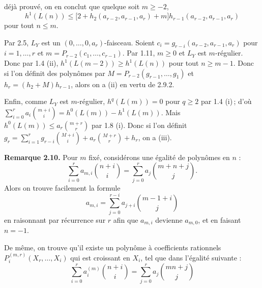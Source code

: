 
déjà
prouvé, on en conclut que quelque soit \(m\ge -2\),
\[
h^1(L(n))\le
\bigl[2+h_2(a_{r-2},a_{r-1},a_r)+m\bigr]
h_{r-1}(a_{r-2},a_{r-1},a_r)
\tag{2.9.2}
\]
pour tout \(n\le m\).

Par 2.5, \(L_Y\) est un \((0,\ldots,0,a_r)\)-faisceau. Soient \(c_i=g_{r-i}(a_{r-2},a_{r-1},a_r)\) pour \(i=1,\ldots,r\) et \(m=P_{r-2}(c_1,\ldots,c_{r-1})\). Par 1.11, \(m\ge0\) et \(L_Y\) est \(m\)-régulier. Donc par 1.4 (ii), \(h^1(L(m-2))\ge h^1(L(n))\) pour tout \(n\ge m-1\). Donc si l'on définit des polynômes par \(M=P_{r-2}(g_{r-1},\ldots,g_1)\) et \(h_r=(h_2+M)h_{r-1}\), alors on a (ii) en vertu de 2.9.2.

Enfin, comme \(L_Y\) est \(m\)-régulier, \(h^q(L(m))=0\) pour \(q\ge2\) par 1.4 (i)\,; d'où \(\sum_{i=0}^{r}a_i\binom{m+i}{i}=h^0(L(m))-h^1(L(m))\). Mais \(h^0(L(m))\le a_r\binom{m+r}{r}\) par 1.8 (i). Donc si l'on définit \(g_r=\sum_{i=1}^{r}g_{r-i}\binom{M+i}{i}+a_r\binom{M+r}{r}+h_r\), on a (iii).

\textbf{Remarque 2.10.} Pour \(m\) fixé, considérons une égalité de polynômes en \(n\) :
\[
\sum_{i=0}^{r}a_{m,i}\binom{n+i}{i}
=
\sum_{j=0}^{r}a_j\binom{m+n+j}{j}.
\]
Alors on trouve facilement la formule
\[
a_{m,i}=\sum_{j=0}^{r-i}a_{j+i}\binom{m-1+i}{j}
\]
en raisonnant par récurrence sur \(r\) afin que \(a_{m,i}\) devienne \(a_{m,0}\), et en faisant \(n=-1\).

De même, on trouve qu'il existe un polynôme à coefficients rationnels \(P_i^{(m,r)}(X_r,\ldots,X_i)\) qui est croissant en \(X_i\), tel que dans l'égalité suivante :
\[
\sum_{i=0}^{r}a_i^{(m)}\binom{n+i}{i}
=
\sum_{j=0}^{r}a_j\binom{mn+j}{j}
\]
